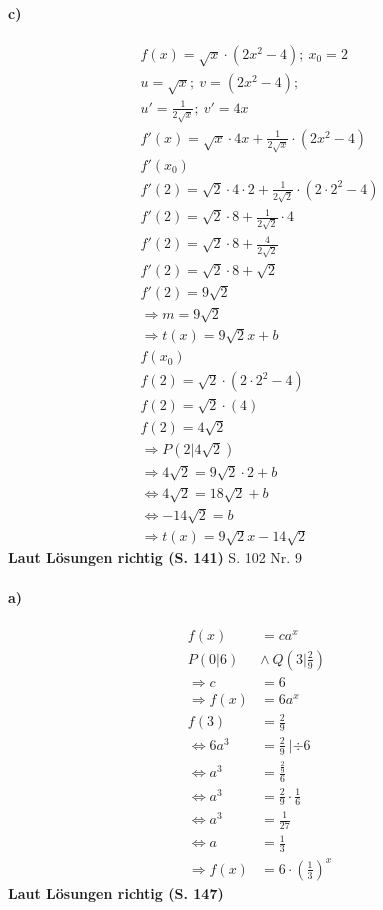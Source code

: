 \documentclass[12pt,a4paper]{report}
\newcommand{\richtig}[1]{\color{ForestGreen}\textbf{
	Laut Lösungen richtig (S. #1)
}\color{black}}
\begin{document}
	\paragraph{c)}
	\begin{align*}
		f(x) = \sqrt{x} \cdot (2x^2 - 4);\ x_0 = 2 \\
		u = \sqrt{x};\ v = (2x^2 - 4);\\
		u'=\frac{1}{2\sqrt{x}};\ v' = 4x \\
		f'(x) = \sqrt{x} \cdot 4x + \frac{1}{2\sqrt{x}} \cdot (2x^2 - 4) \\
		f'(x_0)\\
		f'(2) = \sqrt{2} \cdot 4\cdot 2 + \frac{1}{2\sqrt{2}} \cdot (2\cdot 2^2 - 4) \\
		f'(2) = \sqrt{2} \cdot 8 + \frac{1}{2\sqrt{2}} \cdot 4 \\
		f'(2) = \sqrt{2} \cdot 8 + \frac{4}{2\sqrt{2}} \\
		f'(2) = \sqrt{2} \cdot 8 +\sqrt{2} \\
		f'(2) = 9\sqrt{2} \\
		\Rightarrow m = 9\sqrt{2} \\
		\Rightarrow t(x) = 9\sqrt{2}x + b \\
		f(x_0) \\
		f(2) = \sqrt{2} \cdot (2\cdot 2^2 - 4) \\
		f(2) = \sqrt{2} \cdot (4) \\
		f(2) = 4\sqrt{2} \\
		\Rightarrow P(2|4\sqrt{2}) \\
		\Rightarrow 4\sqrt{2} = 9\sqrt{2}\cdot 2 + b \\
		\Leftrightarrow 4\sqrt{2} = 18\sqrt{2} + b \\
		\Leftrightarrow -14\sqrt{2} = b \\
		\Rightarrow t(x) = 9\sqrt{2}x - 14\sqrt{2}
	\end{align*}
	\richtig{141}
	\newpage
	\noindent
	\Large
	S. 102 Nr. 9
	\large
	\paragraph{a)}
	\begin{align*}
		f(x) &= ca^x \\
		P(0|6)\ &\land\ Q(3|\frac{2}{9}) \\
		\Rightarrow c &= 6 \\
		\Rightarrow f(x) &= 6a^x \\
		f(3) &= \frac{2}{9} \\
		\Leftrightarrow 6a^3 &= \frac{2}{9}\ |\div 6 \\
		\Leftrightarrow a^3 &= \frac{\frac{2}{9}}{6} \\
		\Leftrightarrow a^3 &= \frac{2}{9} \cdot \frac{1}{6} \\
		\Leftrightarrow a^3 &= \frac{1}{27} \\
		\Leftrightarrow a &= \frac{1}{3} \\
		\Rightarrow f(x) &= 6\cdot (\frac{1}{3})^x
	\end{align*}
	\richtig{147}
\end{document}

